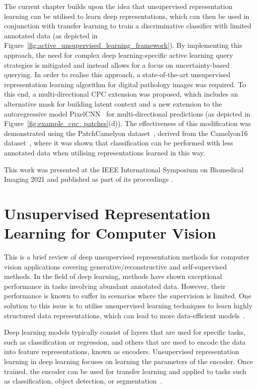 The current chapter builds upon the idea that unsupervised representation learning can be utilised to learn deep representations, which can then be used in conjunction with transfer learning to train a discriminative classifier with limited annotated data (as depicted in Figure~\ref{fig:active_unsupervised_learning_framework}). By implementing this approach, the need for complex deep learning-specific active learning query strategies is mitigated and instead allows for a focus on uncertainty-based querying. In order to realise this approach, a state-of-the-art unsupervised representation learning algorithm for digital pathology images was required. To this end, a multi-directional CPC extension was proposed, which includes an alternative mask for building latent context and a new extension to the autoregressive model PixelCNN~\citep{oord2016pixel} for multi-directional predictions (as depicted in Figure~\ref{fig:example_cpc_patches}(d)). The effectiveness of this modification was demonstrated using the PatchCamelyon dataset~\citep{veeling2018rotation}, derived from the Camelyon16 dataset~\citep{litjens20181399}, where it was shown that classification can be performed with less annotated data when utilising representations learned in this way. 

This work was presented at the IEEE International Symposium on Biomedical Imaging 2021 and published as part of its proceedings \citep{carse2021unsupervised}.



\section{Unsupervised Representation Learning for Computer Vision}
\label{subsec:unsupervised_representation}
This is a brief review of deep unsupervised representation methods for computer vision applications covering generative/reconstructive and self-supervised methods. In the field of deep learning, methods have shown exceptional performance in tasks involving abundant annotated data. However, their performance is known to suffer in scenarios where the supervision is limited. One solution to this issue is to utilise unsupervised learning techniques to learn highly structured data representations, which can lead to more data-efficient models~\citep{lake2015human}.

Deep learning models typically consist of layers that are used for specific tasks, such as classification or regression, and others that are used to encode the data into feature representations, known as encoders. Unsupervised representation learning in deep learning focuses on learning the parameters of the encoder. Once trained, the encoder can be used for transfer learning and applied to tasks such as classification, object detection, or segmentation~\citep{weiss2016survey}.

